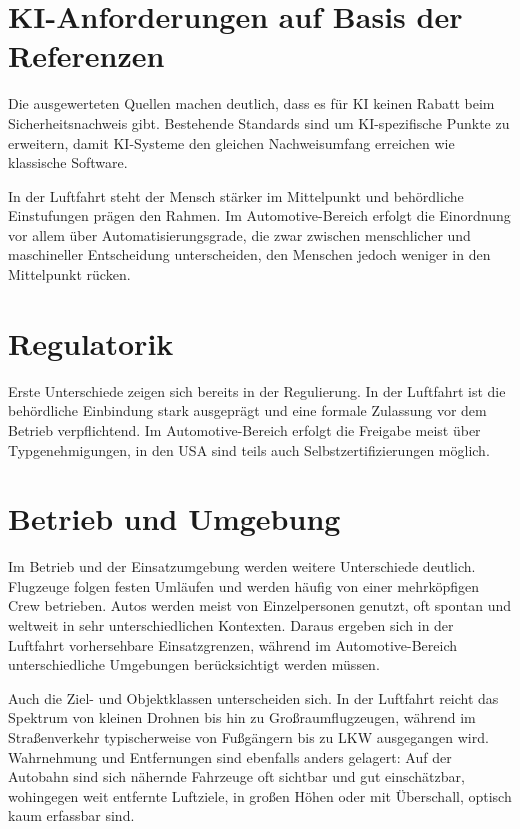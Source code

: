 \section{KI-Anforderungen auf Basis der Referenzen}

Die ausgewerteten Quellen machen deutlich, dass es für KI keinen Rabatt beim Sicherheitsnachweis gibt. 
Bestehende Standards sind um KI-spezifische Punkte zu erweitern, damit KI-Systeme den gleichen 
Nachweisumfang erreichen wie klassische Software.

In der Luftfahrt steht der Mensch stärker im Mittelpunkt und behördliche Einstufungen prägen den Rahmen. 
Im Automotive-Bereich erfolgt die Einordnung vor allem über Automatisierungsgrade, die zwar zwischen 
menschlicher und maschineller Entscheidung unterscheiden, den Menschen jedoch weniger in den Mittelpunkt rücken. 

\section{Regulatorik}

Erste Unterschiede zeigen sich bereits in der Regulierung. In der Luftfahrt ist die behördliche 
Einbindung stark ausgeprägt und eine formale Zulassung vor dem Betrieb verpflichtend. Im Automotive-Bereich 
erfolgt die Freigabe meist über Typgenehmigungen, in den USA sind teils auch Selbstzertifizierungen möglich.


\section{Betrieb und Umgebung}

Im Betrieb und der Einsatzumgebung werden weitere Unterschiede deutlich. 
Flugzeuge folgen festen Umläufen und werden häufig von einer mehrköpfigen Crew betrieben. 
Autos werden meist von Einzelpersonen genutzt, oft spontan und weltweit in sehr unterschiedlichen 
Kontexten. Daraus ergeben sich in der Luftfahrt vorhersehbare Einsatzgrenzen, während im 
Automotive-Bereich unterschiedliche Umgebungen berücksichtigt werden müssen.

Auch die Ziel- und Objektklassen unterscheiden sich. In der Luftfahrt reicht das Spektrum 
von kleinen Drohnen bis hin zu Großraumflugzeugen, während im Straßenverkehr typischerweise von 
Fußgängern bis zu LKW ausgegangen wird. Wahrnehmung und Entfernungen sind ebenfalls 
anders gelagert: Auf der Autobahn sind sich nähernde Fahrzeuge oft sichtbar und gut einschätzbar, 
wohingegen weit entfernte Luftziele, in großen Höhen oder mit Überschall, optisch kaum erfassbar sind.

